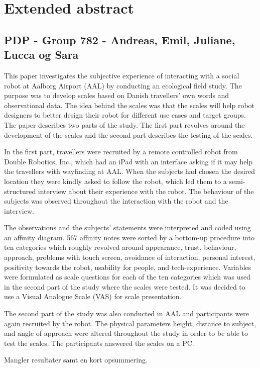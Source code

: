 


\chapter*{Extended abstract}
\label{Abstract}
\section*{PDP - Group 782 - Andreas, Emil, Juliane, Lucca og Sara}

This paper investigates the subjective experience of interacting with a social robot at Aalborg Airport (AAL) by conducting an ecological field study. The purpose was to develop scales based on Danish travellers' own words and observational data. The idea behind the scales was that the scales will help robot designers to better design their robot for different use cases and target groups. The paper describes two parts of the study. The first part revolves around the development of the scales and the second part describes the testing of the scales.

In the first part, travellers were recruited by a remote controlled robot from Double Robotics, Inc., which had an iPad with an interface asking if it may help the travellers with wayfinding at AAL. When the subjects had chosen the desired location they were kindly asked to follow the robot, which led them to a semi-structured interview about their experience with the robot. The behaviour of the subjects was observed throughout the interaction with the robot and the interview. 

The observations and the subjects' statements were interpreted and coded using an affinity diagram. 567 affinity notes were sorted by a bottom-up procedure into ten categories which roughly revolved around appearance, trust, behaviour, approach, problems with touch screen, avoidance of interaction, personal interest, positivity towards the robot, usability for people, and tech-experience.  Variables were formulated as scale questions for each of the ten categories which was used in the second part of the study where the scales were tested. It was decided to use a Visual Analogue Scale (VAS) for scale presentation.

The second part of the study was also conducted in AAL and participants were again recruited by the robot. The physical parameters height, distance to subject, and angle of approach were altered throughout the study in order to be able to test the scales. The participants answered the scales on a PC. 

{\color{red} Mangler resultater samt en kort opsummering.}

